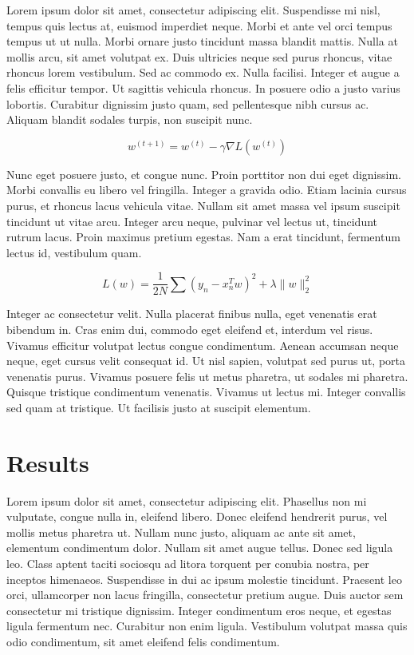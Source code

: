 \documentclass[10pt,conference,compsocconf]{IEEEtran}
\begin{document}
Lorem ipsum dolor sit amet, consectetur adipiscing elit. Suspendisse mi nisl, tempus quis lectus at, euismod imperdiet neque. Morbi et ante vel orci tempus tempus ut ut nulla. Morbi ornare justo tincidunt massa blandit mattis. Nulla at mollis arcu, sit amet volutpat ex. Duis ultricies neque sed purus rhoncus, vitae rhoncus lorem vestibulum. Sed ac commodo ex. Nulla facilisi. Integer et augue a felis efficitur tempor. Ut sagittis vehicula rhoncus. In posuere odio a justo varius lobortis. Curabitur dignissim justo quam, sed pellentesque nibh cursus ac. Aliquam blandit sodales turpis, non suscipit nunc.

\begin{equation}
  \label{eq:a}
	w^{(t+1)} = w^{(t)} - \gamma \nabla L(w^{(t)})
\end{equation}

Nunc eget posuere justo, et congue nunc. Proin porttitor non dui eget dignissim. Morbi convallis eu libero vel fringilla. Integer a gravida odio. Etiam lacinia cursus purus, et rhoncus lacus vehicula vitae. Nullam sit amet massa vel ipsum suscipit tincidunt ut vitae arcu. Integer arcu neque, pulvinar vel lectus ut, tincidunt rutrum lacus. Proin maximus pretium egestas. Nam a erat tincidunt, fermentum lectus id, vestibulum quam.

\begin{equation}
  \label{eq:b}
  L(w) = \frac{1}{2N}\sum{(y_n - x_n^T w)^2} + \lambda \|w\|_{2}^2
\end{equation}

Integer ac consectetur velit. Nulla placerat finibus nulla, eget venenatis erat bibendum in. Cras enim dui, commodo eget eleifend et, interdum vel risus. Vivamus efficitur volutpat lectus congue condimentum. Aenean accumsan neque neque, eget cursus velit consequat id. Ut nisl sapien, volutpat sed purus ut, porta venenatis purus. Vivamus posuere felis ut metus pharetra, ut sodales mi pharetra. Quisque tristique condimentum venenatis. Vivamus ut lectus mi. Integer convallis sed quam at tristique. Ut facilisis justo at suscipit elementum.


\section{Results}
\label{sec:rsults}

Lorem ipsum dolor sit amet, consectetur adipiscing elit. Phasellus non mi vulputate, congue nulla in, eleifend libero. Donec eleifend hendrerit purus, vel mollis metus pharetra ut. Nullam nunc justo, aliquam ac ante sit amet, elementum condimentum dolor. Nullam sit amet augue tellus. Donec sed ligula leo. Class aptent taciti sociosqu ad litora torquent per conubia nostra, per inceptos himenaeos. Suspendisse in dui ac ipsum molestie tincidunt. Praesent leo orci, ullamcorper non lacus fringilla, consectetur pretium augue. Duis auctor sem consectetur mi tristique dignissim. Integer condimentum eros neque, et egestas ligula fermentum nec. Curabitur non enim ligula. Vestibulum volutpat massa quis odio condimentum, sit amet eleifend felis condimentum.
\end{document}
